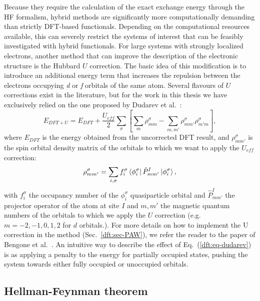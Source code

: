 \begin{refsection}
 \label{dft:sec-dudarev} 
Because they require the calculation of the exact exchange energy through the 
\gls{HF} formalism, hybrid methods are significantly more computationally demanding 
than strictly \gls{DFT}-based functionals. Depending on the computational resources 
available, this can severely restrict the systems of interest that can be 
feasibly investigated with hybrid functionals. For large systems with strongly 
localized electrons, another method that can improve the description of the 
electronic structure is the Hubbard $U$ correction. The basic idea of this 
modification is to introduce an additional energy term that increases the 
repulsion between the electrons occupying \textit{d} or \textit{f} orbitals of 
the same atom. Several flavours of $U$ corrections exist in the literature, 
but for the work in this thesis we have exclusively relied on the one proposed 
by Dudarev et al.~\cite{Dudarev1998}: 
\begin{equation}\label{dft:eq-dudarev} 
E_{DFT+U} = E_{DFT} + \frac{U_{eff}}{2} \sum_\sigma \left[ \sum_m 
\rho_{mm}^\sigma - \sum_{m, m'} \rho_{mm'}^\sigma\rho_{m'm}^\sigma\right], 
\end{equation} 
where $E_{DFT}$ is the energy obtained from the uncorrected \gls{DFT} result, and $\rho^\sigma_{mm'}$ is the spin orbital density matrix of the orbitals to which we 
want to apply the $U_{eff}$ correction:
\begin{equation}
\rho^\sigma_{mm'} = \sum_{i, \sigma} f_i^\sigma \bra{\phi_i^\sigma} \hat{P}_{mm'}^I \ket{\phi_i^\sigma},
\end{equation}
with $f_i^\sigma$ the occupancy number of the $\phi_i^\sigma$ quasiparticle orbital and $\hat{P}_{mm'}^I$ the projector operator of the atom at site $I$ and $m, m'$ the magnetic quantum numbers of the orbitals 
to which we apply the $U$ correction (e.g. $m=-2, -1, 0, 1, 2$ for $d$ 
orbitals.). For more details on how to implement the U correction in the  method (Sec.~\ref{dft:sec-PAW}), we refer the reader to the paper of Bengone et al.~\cite{Bengone2000}. An intuitive way to describe the effect of 
Eq.~(\ref{dft:eq-dudarev}) is as applying a penalty to the energy for partially 
occupied states, pushing the system towards either fully occupied or 
unoccupied orbitals. 

\subsection{Hellman-Feynman theorem} \label{dft:sec-hellmann} 
 

\end{refsection}
